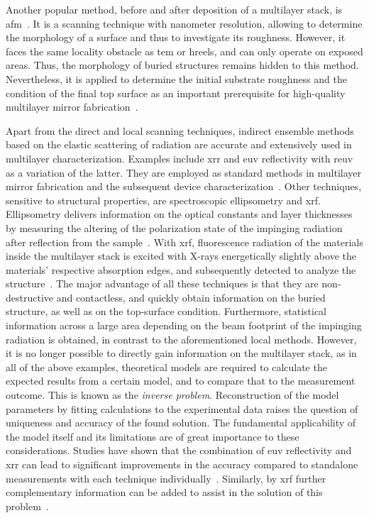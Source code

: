 Another popular method, before and after deposition of a multilayer stack, is
\gls{afm}~\cite{binnig_atomic_1986}.
It is a scanning technique with nanometer resolution, allowing to determine the
morphology of a surface and thus to investigate its roughness.
However, it faces the same locality obstacle as \gls{tem} or \gls{hreels}, and
can only operate on exposed areas.
Thus, the morphology of buried structures remains hidden to this method.
Nevertheless, it is applied to determine the initial substrate roughness and the
condition of the final top surface as an important prerequisite for high-quality
multilayer mirror fabrication~\cite{louis_progress_2000,
bajt_investigation_2001}.

Apart from the direct and local scanning techniques, indirect ensemble methods
based on the elastic scattering of radiation are accurate and extensively used
in multilayer characterization.
Examples include \gls{xrr} and \gls{euv} reflectivity with \gls{reuv} as a
variation of the latter.
They are employed as standard methods in multilayer mirror fabrication and the
subsequent device characterization~\cite{lim_fabrication_2001,
bajt_investigation_2001, braun_mo/si_2002,scholze_high-accuracy_2003}.
Other techniques, sensitive to structural properties, are spectroscopic
ellipsometry and \Gls{xrf}.
Ellipsometry delivers information on the optical constants and layer thicknesses
by measuring the altering of the polarization state of the impinging radiation
after reflection from the sample~\cite{arwin_unambiguous_1984,
liu_thickness_1999}.
With \gls{xrf}, fluorescence radiation of the materials inside the multilayer
stack is excited with X-rays energetically slightly above the materials'
respective absorption edges, and subsequently detected to analyze the
structure~\cite{kortright_standing_1987, kawamura_interface_1994}.
The major advantage of all these techniques is that they are non-destructive and
contactless, and quickly obtain information on the buried structure, as well as
on the top-surface condition.
Furthermore, statistical information across a large area depending on the beam
footprint of the impinging radiation is obtained, in contrast to the
aforementioned local methods.
However, it is no longer possible to directly gain information on the multilayer
stack, as in all of the above examples, theoretical models are required to
calculate the expected results from a certain model, and to compare that to the
measurement outcome.
This is known as the \emph{inverse problem}.
Reconstruction of the model parameters by fitting calculations to the
experimental data raises the question of uniqueness and accuracy of the found
solution.
The fundamental applicability of the model itself and its limitations are of
great importance to these considerations.
Studies have shown that the combination of \gls{euv} reflectivity and
\gls{xrr} can lead to significant improvements in the accuracy compared to
standalone measurements with each technique
individually~\cite{yakunin_combined_2014}.
Similarly, by \Gls{xrf} further complementary information can be added to assist
in the solution of this problem~\cite{ghose_x-ray_2001}.

